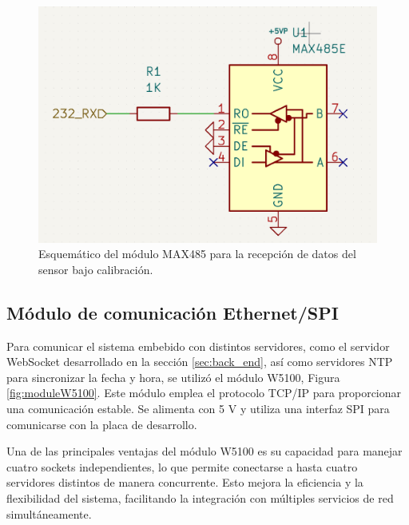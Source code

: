 \begin{figure}[H]
    \centering
    \includegraphics[width=0.7\linewidth]{Figuras/datalogger/Hardware/esquemRS485.png}
    \caption{Esquemático del módulo MAX485 para la recepción de datos del sensor bajo calibración.}
    \label{fig:esquemRS485}
\end{figure}


\subsection{Módulo de comunicación Ethernet/SPI  }\label{sec:moduloEthernet}

Para comunicar el sistema embebido con distintos servidores, como el servidor WebSocket desarrollado en la sección \ref{sec:back_end}, así como servidores NTP para sincronizar la fecha y hora, se utilizó el módulo W5100, Figura \ref{fig:moduleW5100}. Este módulo emplea el protocolo TCP/IP para proporcionar una comunicación estable. Se alimenta con 5 \unit{\volt} y utiliza una interfaz SPI para comunicarse con la placa de desarrollo.

Una de las principales ventajas del módulo W5100 \cite{W5100Datasheet} es su capacidad para manejar cuatro sockets independientes, lo que permite conectarse a hasta cuatro servidores distintos de manera concurrente. Esto mejora la eficiencia y la flexibilidad del sistema, facilitando la integración con múltiples servicios de red simultáneamente.



